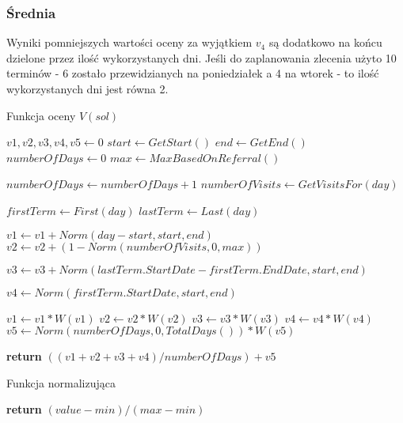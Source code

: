 \subsubsection{Średnia} 
Wyniki pomniejszych wartości oceny za wyjątkiem $v_4$ są dodatkowo na końcu dzielone przez ilość
wykorzystanych dni. Jeśli do zaplanowania zlecenia użyto 10 terminów - 6 zostało
przewidzianych na poniedziałek a 4 na wtorek - to ilość wykorzystanych dni jest
równa 2.

\begin{algorithm}
	\caption{Funkcja oceny $V(sol)$}\label{fn-obj}
\begin{algorithmic}[1]
\State $v1,v2,v3,v4,v5 \gets 0$
\State $start \gets GetStart()$
\State $end \gets GetEnd()$
\State $numberOfDays \gets 0$
\State $max \gets MaxBasedOnReferral()$

\State $numberOfDays \gets numberOfDays+1$
\State $numberOfVisits \gets GetVisitsFor(day)$

\State $firstTerm \gets First(day)$
\State $lastTerm \gets Last(day)$

\State $v1 \gets v1 + Norm(day-start,start,end)$
\State $v2 \gets v2 + (1 - Norm(numberOfVisits,0,max))$

\State $v3 \gets v3 + Norm(lastTerm.StartDate-firstTerm.EndDate,start,end)$
\EndIf

\State $v4 \gets Norm(firstTerm.StartDate,start,end)$

\EndFor
\State $v1 \gets v1*W(v1)$
\State $v2 \gets v2*W(v2)$
\State $v3 \gets v3*W(v3)$
\State $v4 \gets v4*W(v4)$
\State $v5 \gets Norm(numberOfDays,0,TotalDays())*W(v5)$

\State \textbf{return} $((v1+v2+v3+v4)/numberOfDays)+v5$
\EndProcedure
\end{algorithmic}
\end{algorithm}

\begin{algorithm}
	\caption{Funkcja normalizująca}\label{fn-normalize}
\begin{algorithmic}[1]
\State \textbf{return} $(value-min)/(max-min)$
\EndFunction
\end{algorithmic}
\end{algorithm}
\newpage
